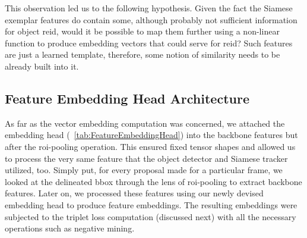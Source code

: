 This observation led us to the following hypothesis. Given the fact the Siamese exemplar features do contain some, although probably not sufficient information for object \gls{reid}, would it be possible to map them further using a non-linear function to produce embedding vectors that could serve for \gls{reid}? Such features are just a learned template, therefore, some notion of similarity needs to be already built into it.

\subsection{Feature Embedding Head Architecture}

As far as the vector embedding computation was concerned, we attached the embedding head (\tablestr{}~\ref{tab:FeatureEmbeddingHead}) into the backbone features but after the \gls{roi}-pooling operation. This ensured fixed tensor shapes and allowed us to process the very same feature that the object detector and Siamese tracker utilized, too. Simply put, for every proposal made for a particular frame, we looked at the delineated \gls{bbox} through the lens of \gls{roi}-pooling to extract backbone features. Later on, we processed these features using our newly devised embedding head to produce feature embeddings. The resulting embeddings were subjected to the triplet loss computation (discussed next) with all the necessary operations such as negative mining.


